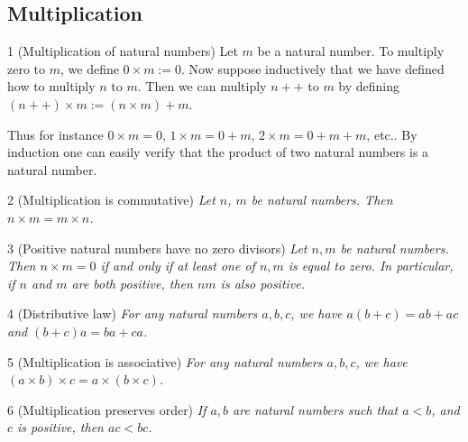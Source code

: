 \subsection{Multiplication}
\begin{definition}{1}
    \label{nat-multiplication}
    (Multiplication of natural numbers) Let $m$ be a natural number. To multiply zero to $m$, we define $0\times m := 0$. Now suppose inductively that we have defined how to multiply $n$ to $m$. Then we can multiply $n++$ to $m$ by defining $(n++)\times m := (n\times m) + m$.

    Thus for instance $0 \times m=0$, $1\times m = 0+m$, $2\times m = 0 +  m + m$, etc.. By induction one can easily verify that the product of two natural numbers is a natural number.
\end{definition}

\begin{lemma}{2}
    \label{nat-mul-comm}
    (Multiplication is commutative) \emph{Let $n$, $m$ be natural numbers. Then $n\times m = m\times n$.}
\end{lemma}

\begin{lemma}{3}
    \label{nat-no-zero-divisors}
    (Positive natural numbers have no zero divisors) \emph{Let $n, m$ be natural numbers. Then $n\times m = 0$ if and only if at least one of $n, m$ is equal to zero. In particular, if $n$ and $m$ are both positive, then $nm$ is also positive.}
\end{lemma}

\begin{proposition}{4}
    \label{nat-distributive}
    (Distributive law) \emph{For any natural numbers $a,b,c$, we have $a(b+c)=ab+ac$ and $(b+c)a=ba+ca$.}
\end{proposition}

\begin{proposition}{5}
    \label{nat-mul-assoc}
    (Multiplication is associative) \emph{For any natural numbers $a,b,c$, we have $(a\times b)\times c = a\times (b\times c)$.}
\end{proposition}

\begin{proposition}{6}
    \label{nat-mul-preserves-order}
    (Multiplication preserves order) \emph{If $a, b$ are natural numbers such that $a < b$, and $c$ is positive, then $ac < bc$.}
\end{proposition}

